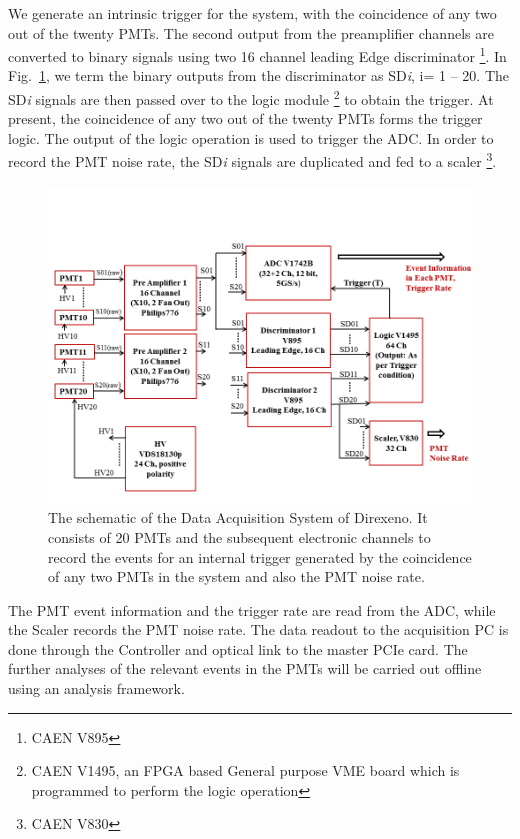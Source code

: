We generate an intrinsic trigger for the system, 
with the coincidence of any two out of the twenty PMTs. The second output from the 
preamplifier channels are converted to binary signals using two 16 channel leading 
Edge discriminator \footnote{CAEN V895}. In Fig.~\ref{Fig:DAQscheme}, we term the binary 
outputs from the discriminator as SD{\it i}, i= 1 -- 20. The SD{\it i} signals are then passed over to 
the logic module \footnote{CAEN V1495, an FPGA based General purpose VME board which is programmed to perform the 
logic operation} to obtain the trigger. At present, the coincidence of any two out 
of the twenty PMTs forms the trigger logic. The output of the logic operation is 
used to trigger the ADC. In order to record the PMT noise rate, the 
SD{\it i} signals are duplicated and fed to a scaler \footnote{CAEN V830}.


\begin{figure}
   \centering
   \includegraphics[width=\textwidth]{DAQscheme.png}
   \caption{The schematic of the Data Acquisition System of Direxeno. It 
        consists of 20 PMTs and the subsequent electronic channels to record 
        the events for an internal trigger generated by the coincidence of any 
        two PMTs in the system and also the PMT noise rate.}
   \label{Fig:DAQscheme}
\end{figure}

The PMT event information and the trigger rate are read from the ADC, while the Scaler 
records the PMT noise rate. The data readout to the acquisition PC is done through the 
Controller and optical link to the master PCIe card. The further analyses of the 
relevant events in the PMTs will be carried out offline using an analysis 
framework.





\clearpage %